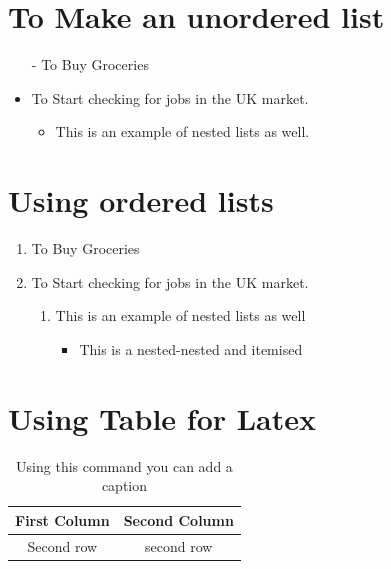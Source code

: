 \documentclass{report}
\theoremstyle{plain} %
\begin{document}
\section {To Make an unordered list}
\begin{itemize} %
    \item [-] To Buy Groceries %
    \item To  Start checking for jobs in the UK market.
    \begin{itemize}
        \item  This is an example of nested lists as well.
    \end{itemize}
\end{itemize}
\newpage
\section{Using ordered lists}
\begin{enumerate} [i] %
\item To Buy Groceries
\item To  Start checking for jobs in the UK market.
    \begin{enumerate}
        \item This is an example of nested lists as well
        \begin{itemize}
            \item This is a nested-nested and itemised
        \end{itemize}
    \end{enumerate}
\end{enumerate}

\section{Using Table for Latex} 
\begin{table} [h] %
\centering  %
\begin{tabular}{ |c |c|} %
   First Column & Second Column \\\hline %
   Second row & second row 
\end{tabular}
\caption{Using this command you can add a caption}
\end{table}
\end{document}
